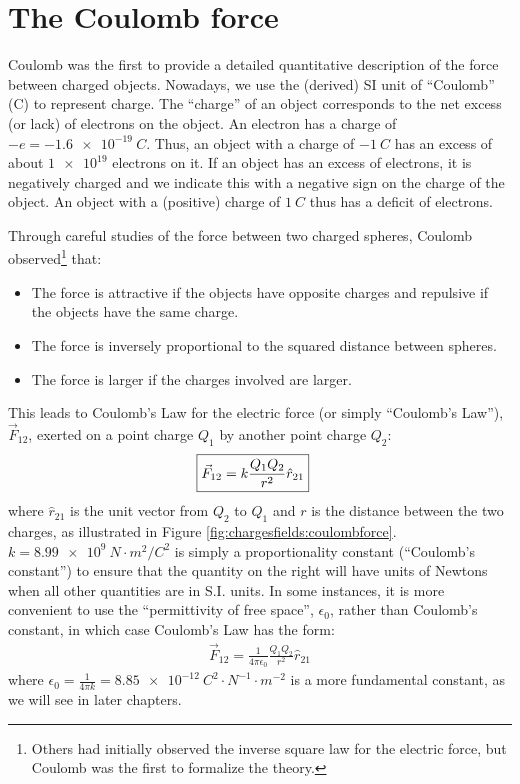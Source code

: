 
\section{The Coulomb force}
Coulomb was the first to provide a detailed quantitative description of the force between charged objects. Nowadays, we use the (derived) SI unit of ``Coulomb'' (C) to represent charge. The ``charge'' of an object corresponds to the net excess (or lack) of electrons on the object. An electron has a charge of $-e=\SI{-1.6e-19}{C}$. Thus, an object with a charge of $\SI{-1}{C}$ has an excess of about $\num{1e19}$ electrons on it. If an object has an excess of electrons, it is negatively charged and we indicate this with a negative sign on the charge of the object. An object with a (positive) charge of $\SI{1}{C}$ thus has a deficit of electrons.

Through careful studies of the force between two charged spheres, Coulomb observed\footnote{Others had initially observed the inverse square law for the electric force, but Coulomb was the first to formalize the theory.} that:
\begin{itemize}
\item The force is attractive if the objects have opposite charges and repulsive if the objects have the same charge.
\item The force is inversely proportional to the squared distance between spheres.
\item The force is larger if the charges involved are larger. 
\end{itemize}
This leads to Coulomb's Law for the electric force (or simply ``Coulomb's Law''), $\vec F_{12}$, exerted on a point charge $Q_1$ by another point charge $Q_2$:
\begin{align*}
\Aboxed{\vec F_{12}=k\frac{Q_1Q_2}{r^2}\hat r_{21}}
\end{align*}
where $\hat r_{21}$ is the unit vector from $Q_2$ to $Q_1$ and $r$ is the distance between the two charges, as illustrated in Figure \ref{fig:chargesfields:coulombforce}. $k=\SI{8.99e9}{N\cdot m^2/C^{2}}$ is simply a proportionality constant (``Coulomb's constant'') to ensure that the quantity on the right will have units of Newtons when all other quantities are in S.I. units. In some instances, it is more convenient to use the ``permittivity of free space'', $\epsilon_0$, rather than Coulomb's constant, in which case Coulomb's Law has the form:
\begin{align*}
\vec F_{12}=\frac{1}{4\pi\epsilon_0}\frac{Q_1Q_2}{r^2}\hat r_{21}
\end{align*}
where $\epsilon_0=\frac{1}{4\pi k}=\SI{8.85e-12}{C^2\cdot N^{-1}\cdot m^{-2}}$ is a more fundamental constant, as we will see in later chapters.


